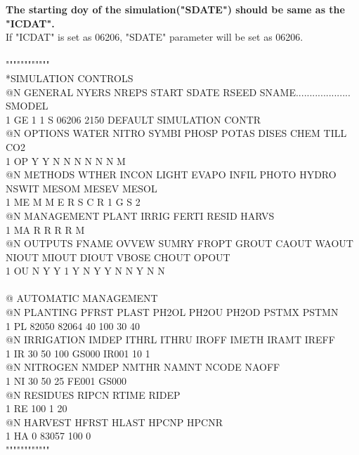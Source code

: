 \documentclass[11pt,a4j]{jarticle}
\begin{document}
{\bf The starting doy of the simulation("SDATE") should be same as the "ICDAT".}\\

If "ICDAT" is set as 06206, "SDATE" parameter will be set as 06206.\\
\\
""""""""""""\\
*SIMULATION CONTROLS\\
@N GENERAL     NYERS NREPS START SDATE RSEED SNAME.................... SMODEL\\
 1 GE              1     1     S 06206  2150 DEFAULT SIMULATION CONTR\\
@N OPTIONS     WATER NITRO SYMBI PHOSP POTAS DISES  CHEM  TILL   CO2\\
 1 OP              Y     Y     N     N     N     N     N     N     M\\
@N METHODS     WTHER INCON LIGHT EVAPO INFIL PHOTO HYDRO NSWIT MESOM MESEV MESOL\\
 1 ME              M     M     E     R     S     C     R     1     G     S     2\\
@N MANAGEMENT  PLANT IRRIG FERTI RESID HARVS\\
 1 MA              R     R     R     R     M\\
@N OUTPUTS     FNAME OVVEW SUMRY FROPT GROUT CAOUT WAOUT NIOUT MIOUT DIOUT VBOSE CHOUT OPOUT\\
 1 OU              N     Y     Y     1     Y     N     Y     Y     N     N     Y     N     N\\
\\
@  AUTOMATIC MANAGEMENT\\
@N PLANTING    PFRST PLAST PH2OL PH2OU PH2OD PSTMX PSTMN\\
 1 PL          82050 82064    40   100    30    40  \\
@N IRRIGATION  IMDEP ITHRL ITHRU IROFF IMETH IRAMT IREFF\\
 1 IR             30    50   100 GS000 IR001    10     1\\
@N NITROGEN    NMDEP NMTHR NAMNT NCODE NAOFF\\
 1 NI             30    50    25 FE001 GS000\\
@N RESIDUES    RIPCN RTIME RIDEP\\
 1 RE            100     1    20\\
@N HARVEST     HFRST HLAST HPCNP HPCNR\\
 1 HA              0 83057   100     0\\
 """"""""""""\\
 
 
\end{document}

